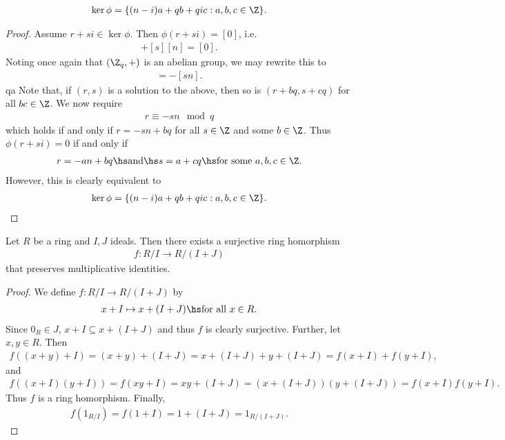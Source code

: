 \documentclass{article}
\begin{document}
\begin{claim*}[4]
   \begin{align*}
      \ker\phi = \{(n-i)a+qb + qic:a,b,c\in\Z\}.
   \end{align*} 
   \begin{proof}
      Assume $r+si\in\ker\phi$. Then $\phi(r+si)=[0]$, i.e. 
      \begin{align*}
         [r]+[s][n]=[0].
      \end{align*}
      Noting once again that $(\Z_q,+)$ is an abelian group, we may rewrite this to 
      \begin{align*}
         [r] = -[sn].
      \end{align*}qa
      Note that, if $(r,s)$ is a solution to the above, then so is $(r+bq, s+cq)$ for all $bc\in\Z$.
      We now require 
      \begin{align*}
         r \equiv -sn \mod q
      \end{align*}
      which holds if and only if $r=-sn + bq$ for all $s\in\Z$ and some $b\in\Z$. Thus $\phi(r+si)=0$
      if and only if 
      \begin{align*}
         r=-an+bq \hs\text{and}\hs s=a+cq\hs\text{for some }a,b,c\in\Z.
      \end{align*}
      However, this is clearly equivalent to  
      \begin{align*}
         \ker\phi = \{(n-i)a + qb + qic : a,b,c\in\Z\}.
      \end{align*}
   \end{proof}
\end{claim*}

\begin{lemma*}
   Let $R$ be a ring and $I,J$ ideals. Then there exists a surjective ring homorphism
   \begin{align*}
      f:R/I \to R/(I+J)
   \end{align*}
   that preserves multiplicative identities.
   \begin{proof}
      We define $f:R/I \to R/(I+J)$ by 
      \begin{align*}
         x + I \mapsto x + (I + J) \hs \text{for all }x\in R.
      \end{align*}
      Since $0_R\in J$, $x+I\subseteq x+(I+J)$ and thus $f$ is clearly surjective. Further, 
      let $x,y\in R$. Then
      \begin{align*}
         f((x+y)+I)=(x+y)+(I+J) = x+(I+J) + y + (I+J) = f(x+I) + f(y+I),
      \end{align*}
      and 
      \begin{align*}
         f((x+I)(y+I)) = f(xy+I) = xy+(I+J) = (x+(I+J))(y+(I+J)) = f(x+I)f(y+I).
      \end{align*}
      Thus $f$ is a ring homorphism. Finally, 
      \begin{align*}
         f(1_{R/I}) = f(1+I) = 1+(I+J) = 1_{R/(I+J)}.
      \end{align*}
   \end{proof}
\end{lemma*}
\end{document}
